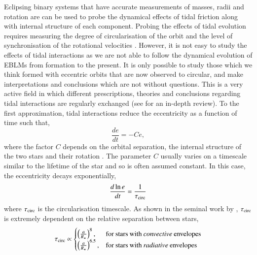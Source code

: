 Eclipsing binary systems that have accurate measurements of masses, radii and rotation are can be used to probe the dynamical effects of tidal friction along with internal structure of each component. Probing the effects of tidal evolution requires measuring the degree of circularisation of the orbit and the level of synchronisation of the rotational velocities \citep{2010A&ARv..18...67T}. However, it is not easy to study the effects of tidal interactions as we are not able to follow the dynamical evolution of EBLMs from formation to the present. It is only possible to study those which we think formed with eccentric orbits that are now observed to circular, and make interpretations and conclusions which are not without questions. This is a very active field in which different prescriptions, theories and conclusions regarding tidal interactions are regularly exchanged (see \citet{2008EAS....29....1M} for an in-depth review). To the first approximation, tidal interactions reduce the eccentricity as a function of time such that,
%
\begin{equation}
    \frac{de}{dt} = -Ce,
\end{equation}
%
where the factor $C$ depends on the orbital separation, the internal structure of the two stars and their rotation \citep{2008EAS....29....1M}. The parameter $C$ usually varies on a timescale similar to the lifetime of the star and so is often assumed constant. In this case, the eccentricity decays exponentially,
%
\begin{equation}
    \frac{d\ln e}{dt} = \frac{1}{\tau_{\rm circ}}
\end{equation}
% 
where $\tau_{\rm circ}$ is the circularisation timescale. As shown in the seminal work by \citet{1975A&A....41..329Z}, $\tau_{\rm circ}$ is extremely dependent on the relative separation between stars,
%
\begin{equation}
    \tau_{\rm circ} \propto 
    \begin{cases}
    \left( \frac{a}{R_\star} \right)^8,  & \rm for \:\rm stars \:\rm with \: \textit{convective} \:\rm envelopes \\
    \left( \frac{a}{R_\star} \right)^{6.5},   & \rm for \:\rm stars \:\rm with \: \textit{radiative} \:\rm envelopes \\
    \end{cases}
\end{equation}
%
